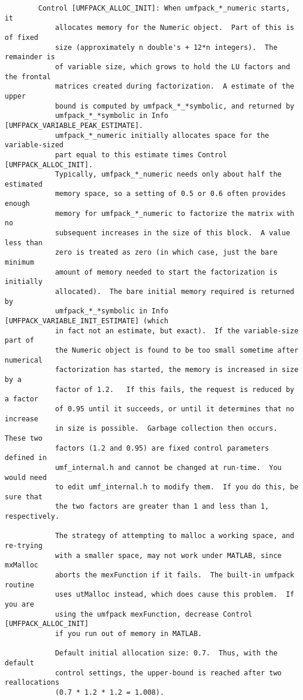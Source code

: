 {\begin{verbatim}
        Control [UMFPACK_ALLOC_INIT]: When umfpack_*_numeric starts, it
            allocates memory for the Numeric object.  Part of this is of fixed
            size (approximately n double's + 12*n integers).  The remainder is
            of variable size, which grows to hold the LU factors and the frontal
            matrices created during factorization.  A estimate of the upper
            bound is computed by umfpack_*_*symbolic, and returned by
            umfpack_*_*symbolic in Info [UMFPACK_VARIABLE_PEAK_ESTIMATE].
            umfpack_*_numeric initially allocates space for the variable-sized
            part equal to this estimate times Control [UMFPACK_ALLOC_INIT].
            Typically, umfpack_*_numeric needs only about half the estimated
            memory space, so a setting of 0.5 or 0.6 often provides enough
            memory for umfpack_*_numeric to factorize the matrix with no
            subsequent increases in the size of this block.  A value less than
            zero is treated as zero (in which case, just the bare minimum
            amount of memory needed to start the factorization is initially
            allocated).  The bare initial memory required is returned by
            umfpack_*_*symbolic in Info [UMFPACK_VARIABLE_INIT_ESTIMATE] (which
            in fact not an estimate, but exact).  If the variable-size part of
            the Numeric object is found to be too small sometime after numerical
            factorization has started, the memory is increased in size by a
            factor of 1.2.   If this fails, the request is reduced by a factor
            of 0.95 until it succeeds, or until it determines that no increase
            in size is possible.  Garbage collection then occurs.  These two
            factors (1.2 and 0.95) are fixed control parameters defined in
            umf_internal.h and cannot be changed at run-time.  You would need
            to edit umf_internal.h to modify them.  If you do this, be sure that
            the two factors are greater than 1 and less than 1, respectively.

            The strategy of attempting to malloc a working space, and re-trying
            with a smaller space, may not work under MATLAB, since mxMalloc
            aborts the mexFunction if it fails.  The built-in umfpack routine
            uses utMalloc instead, which does cause this problem.  If you are
            using the umfpack mexFunction, decrease Control [UMFPACK_ALLOC_INIT]
            if you run out of memory in MATLAB.

            Default initial allocation size: 0.7.  Thus, with the default
            control settings, the upper-bound is reached after two reallocations
            (0.7 * 1.2 * 1.2 = 1.008).


\end{verbatim}}
